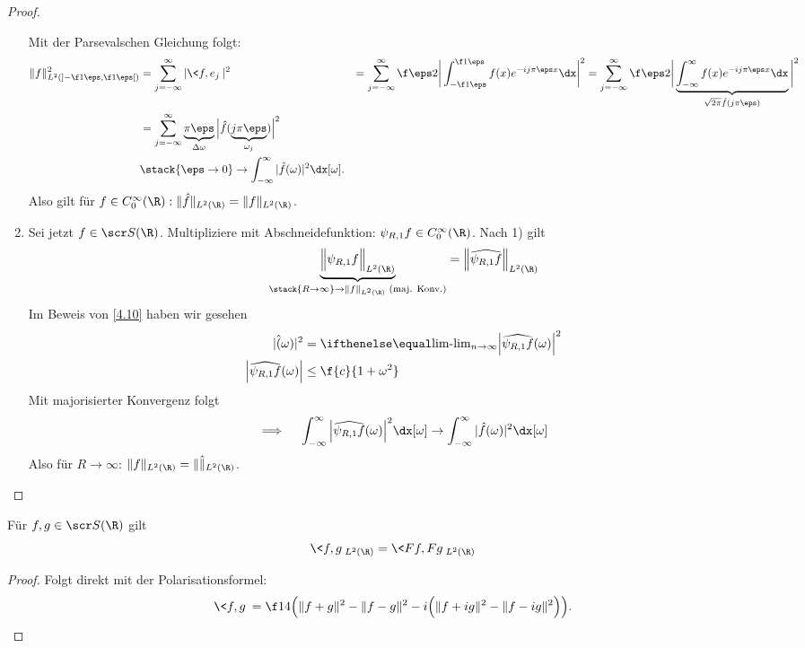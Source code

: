 \begin{st}
\begin{proof}
\begin{enumerate}[1)]
				Mit der Parsevalschen Gleichung folgt:
				\begin{align*}
					\|f\|_{L^2(]-\f 1\eps, \f 1\eps[)}^2 
					&= \sum_{j=-\infty}^\infty |\<f,e_j\>|^2 
					&= \sum_{j=-\infty}^\infty \f \eps 2 \bigg| \int_{-\f 1\eps}^{\f 1\eps} f(x) e^{-ij\pi \eps x} \dx \bigg|^2
					&= \sum_{j=-\infty}^\infty \f \eps 2 \bigg| \underbrace{\int_{-\infty}^{\infty} f(x) e^{-ij\pi \eps x} \dx}_{\sqrt{2\pi} \hat f (j\pi \eps)} \bigg|^2 \\
					&= \sum_{j=-\infty}^\infty \underbrace{\pi \eps}_{\Delta \omega} \Big| \hat f(\underbrace{j\pi \eps}_{\omega_j})\Big|^2 \\
					&\stack{\eps \to 0}\to \int_{-\infty}^\infty |\hat f(\omega)|^2 \dx[\omega].
				\end{align*}
				Also gilt für $f \in C_0^\infty(\R) : \|\hat f\|_{L^2(\R)} = \|f\|_{L^2(\R)}$.
			\item
				Sei jetzt $f \in \scr S(\R)$.
				Multipliziere mit Abschneidefunktion: $\psi_{R,1} f \in C_0^\infty(\R)$.
				Nach 1) gilt
				\[
					\underbrace{\Big\|\psi_{R,1} f\Big\|_{L^2(\R)}}_{\stack{R\to \infty}\to \|f\|_{L^2(\R)} \text{ (maj. Konv.)}} = \Big\| \widehat{\psi_{R,1} f} \Big\|_{L^2(\R)}
				\]
				Im Beweis von \ref{4.10} haben wir gesehen
				\begin{align*}
					|\hat(\omega)|^2 &= \lim_{n\to\infty}\Big| \widehat{\psi_{R,1}f}(\omega) \Big|^2 \\
					\Big| \widehat{\psi_{R,1} f}(\omega) \Big| &\le \f {c}{1+\omega^2}
				\end{align*}
				Mit majorisierter Konvergenz folgt
				\[
					\implies \quad \int_{-\infty}^\infty \Big| \widehat{\psi_{R,1}f}(\omega)\Big|^2 \dx[\omega] \to \int_{-\infty}^\infty |\hat f(\omega)|^2 \dx[\omega]
				\]
				Also für $R \to \infty$: $\|f\|_{L^2(\R)} = \|\hat \|_{L^2(\R)}$.
		\end{enumerate}
	\end{proof}
\end{st}

\begin{kor} \label{4.16}
	Für $f,g \in \scr S(\R)$ gilt
	\[
		\<f,g\>_{L^2(\R)} = \< Ff, Fg\>_{L^2(\R)}
	\]
	\begin{proof}
		Folgt direkt mit der Polarisationsformel:
		\[
			\<f,g\> = \f 14 \Big( \|f+g\|^2 - \|f-g\|^2 - i \Big(\|f+ig\|^2 - \|f-ig\|^2 \Big) \Big).
		\]
	\end{proof}
\end{kor}

